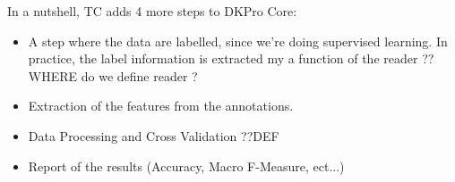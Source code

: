 In a nutshell, TC adds 4 more steps to DKPro Core:
  \begin{itemize}
  \item A step where the data are labelled, since we're doing supervised learning. In practice, the label information is extracted my a function of the reader ??WHERE do we define reader ?
  \item Extraction of the features from the annotations.
  \item Data Processing and Cross Validation ??DEF 
  \item Report of the results (Accuracy, Macro F-Measure, ect...)
\end{itemize}  

















